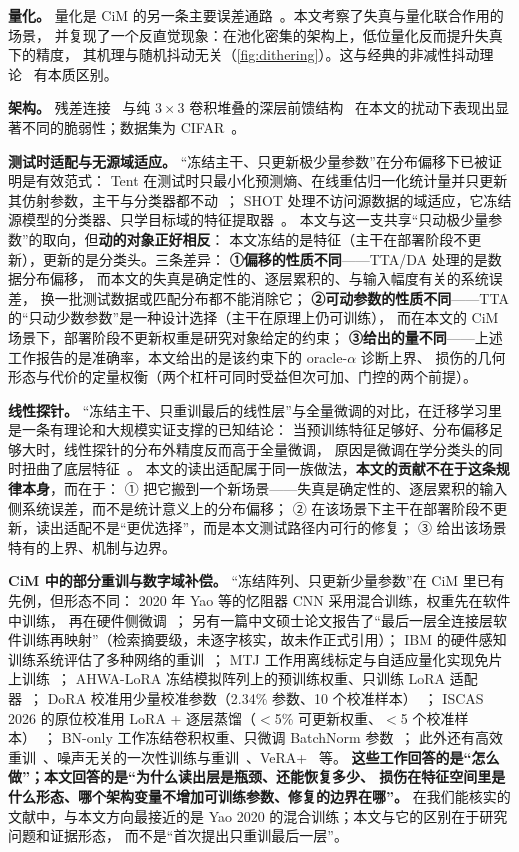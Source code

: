 \documentclass[11pt,a4paper]{ctexart}
\begin{document}
\textbf{量化。}
量化是 CiM 的另一条主要误差通路~\cite{quant}。本文考察了失真与量化联合作用的场景，
并复现了一个反直觉现象：在池化密集的架构上，低位量化反而提升失真下的精度，
其机理与随机抖动无关（\cref{fig:dithering}）。这与经典的非减性抖动理论~\cite{dither} 有本质区别。

\textbf{架构。}
残差连接~\cite{resnet} 与纯 $3\times3$ 卷积堆叠的深层前馈结构~\cite{vgg}
在本文的扰动下表现出显著不同的脆弱性；数据集为 CIFAR~\cite{cifar}。

\textbf{测试时适配与无源域适应。}
“冻结主干、只更新极少量参数”在分布偏移下已被证明是有效范式：
Tent 在测试时只最小化预测熵、在线重估归一化统计量并只更新其仿射参数，主干与分类器都不动~\cite{tent}；
SHOT 处理不访问源数据的域适应，它冻结源模型的分类器、只学目标域的特征提取器~\cite{shot}。
本文与这一支共享“只动极少量参数”的取向，但\textbf{动的对象正好相反}：
本文冻结的是特征（主干在部署阶段不更新），更新的是分类头。三条差异：
\textbf{①偏移的性质不同}——TTA/DA 处理的是数据分布偏移，
而本文的失真是确定性的、逐层累积的、与输入幅度有关的系统误差，
换一批测试数据或匹配分布都不能消除它；
\textbf{②可动参数的性质不同}——TTA 的“只动少数参数”是一种设计选择（主干在原理上仍可训练），
而在本文的 CiM 场景下，部署阶段不更新权重是研究对象给定的约束；
\textbf{③给出的量不同}——上述工作报告的是准确率，本文给出的是该约束下的 oracle-$\alpha$ 诊断上界、
损伤的几何形态与代价的定量权衡（两个杠杆可同时受益但次可加、门控的两个前提）。

\textbf{线性探针。}
“冻结主干、只重训最后的线性层”与全量微调的对比，在迁移学习里是一条有理论和大规模实证支撑的已知结论：
当预训练特征足够好、分布偏移足够大时，线性探针的分布外精度反而高于全量微调，
原因是微调在学分类头的同时扭曲了底层特征~\cite{lpft}。
本文的读出适配属于同一族做法，\textbf{本文的贡献不在于这条规律本身}，而在于：
① 把它搬到一个新场景——失真是确定性的、逐层累积的输入侧系统误差，而不是统计意义上的分布偏移；
② 在该场景下主干在部署阶段不更新，读出适配不是“更优选择”，而是本文测试路径内可行的修复；
③ 给出该场景特有的上界、机制与边界。

\textbf{CiM 中的部分重训与数字域补偿。}
“冻结阵列、只更新少量参数”在 CiM 里已有先例，但形态不同：
2020 年 Yao 等的忆阻器 CNN 采用混合训练，权重先在软件中训练，
再在硬件侧微调~\cite{yao2020}；
另有一篇中文硕士论文报告了“最后一层全连接层软件训练再映射”（检索摘要级，未逐字核实，故未作正式引用）；
IBM 的硬件感知训练系统评估了多种网络的重训~\cite{rasch2023}；
MTJ 工作用离线标定与自适应量化实现免片上训练~\cite{mtjcal}；
AHWA-LoRA 冻结模拟阵列上的预训练权重、只训练 LoRA 适配器~\cite{ahwa_lora}；
DoRA 校准用少量校准参数（2.34\% 参数、10 个校准样本）~\cite{dora}；
ISCAS 2026 的原位校准用 LoRA + 逐层蒸馏（$<$5\% 可更新权重、$<$5 个校准样本）~\cite{kong2026}；
BN-only 工作冻结卷积权重、只微调 BatchNorm 参数~\cite{bn_only}；
此外还有高效重训~\cite{klein2021}、噪声无关的一次性训练与重训~\cite{bommana2026}、VeRA+~\cite{vera} 等。
\textbf{这些工作回答的是“怎么做”；本文回答的是“为什么读出层是瓶颈、还能恢复多少、
损伤在特征空间里是什么形态、哪个架构变量不增加可训练参数、修复的边界在哪”。}
在我们能核实的文献中，与本文方向最接近的是 Yao 2020 的混合训练；本文与它的区别在于研究问题和证据形态，
而不是“首次提出只重训最后一层”。
\end{document}
